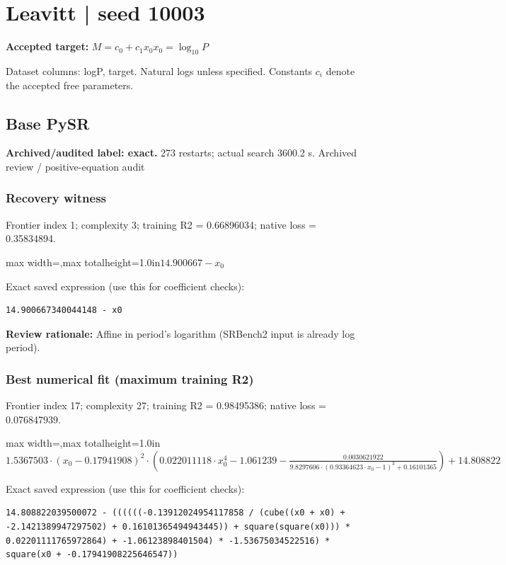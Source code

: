 \documentclass[10pt,letterpaper,landscape]{article}
\begin{document}
\section*{Leavitt | seed 10003}
\textbf{Accepted target:} $\displaystyle M=c_0+c_1x_0$\hfill $x_0=\log_{10}P$\par
{\small Dataset columns: logP, target. Natural logs unless specified. Constants $c_i$ denote the accepted free parameters.}\par\medskip
\begin{minipage}[t]{0.485\textwidth}
\subsection*{Base PySR}
\textbf{Archived/audited label: exact.} 273 restarts; actual search 3600.2 s.
{\small Archived review / positive-equation audit}
\subsubsection*{Recovery witness}
Frontier index 1; complexity 3; training R2 = 0.66896034; native loss = 0.35834894.
\begin{center}\begin{adjustbox}{max width=\linewidth,max totalheight=1.0in}$\displaystyle 14.900667 - x_{0}$\end{adjustbox}\end{center}
{\scriptsize Exact saved expression (use this for coefficient checks):}
\begin{lstlisting}
14.900667340044148 - x0
\end{lstlisting}
{\small\textbf{Review rationale:} Affine in period's logarithm (SRBench2 input is already log period).}
\subsubsection*{Best numerical fit (maximum training R2)}
Frontier index 17; complexity 27; training R2 = 0.98495386; native loss = 0.076847939.
\begin{center}\begin{adjustbox}{max width=\linewidth,max totalheight=1.0in}$\displaystyle 1.5367503 \cdot \left(x_{0} - 0.17941908\right)^{2} \cdot \left(0.022011118 \cdot x_{0}^{4} - 1.061239 - \frac{0.0030621922}{9.8297606 \cdot \left(0.93364623 \cdot x_{0} - 1\right)^{3} + 0.16101365}\right) + 14.808822$\end{adjustbox}\end{center}
{\scriptsize Exact saved expression (use this for coefficient checks):}
\begin{lstlisting}
14.808822039500072 - ((((((-0.13912024954117858 / (cube((x0 + x0) + -2.1421389947297502) + 0.16101365494943445)) + square(square(x0))) * 0.02201111765972864) + -1.06123898401504) * -1.53675034522516) * square(x0 + -0.17941908225646547))
\end{lstlisting}
\end{minipage}\hfill
\end{document}
